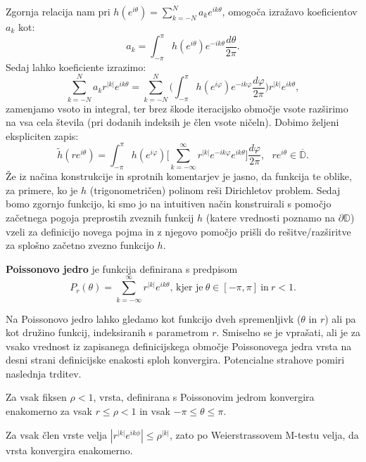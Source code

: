 \documentclass[mat1]{fmfdelo}
\begin{document}
        Zgornja relacija nam pri $h(e^{i\theta}) = \sum_{k = -N}^{N}{a_k e^{ik\theta}}$, omogoča izražavo koeficientov $a_k$ kot:
        $$
            a_ k = \int_{-\pi}^{\pi}{h(e^{i\theta}) e^{-ik\theta}\frac{d\theta}{2\pi}}.
        $$
    Sedaj lahko koeficiente izrazimo:
    $$
        \sum_{k = - N}^{N}{ a_k r^{|k|}e^{ik\theta}} = \sum_{k = - N}^{N} \bigg(\int_{-\pi}^{\pi}{h(e^{i \varphi}) e^{- i k \varphi} \frac{d \varphi}{2 \pi}}\bigg) r^{|k|} e^{i k \theta},
    $$
    zamenjamo vsoto in integral, ter brez škode iteracijsko območje vsote razširimo na vsa cela števila (pri dodanih indeksih je člen vsote ničeln). Dobimo željeni ekspliciten zapis:
    \begin{equation}
        \label{int1}
        \tag{P}
        \widetilde{h}(r e^{i \theta}) = \int_{-\pi}^{\pi}{h(e^{i \varphi}) \bigg[\sum_{k = - \infty}^{\infty} r^{|k|} e^{- i k \varphi} e^{i k \theta}} \bigg]\frac{d \varphi}{2 \pi}, ~~~ r e^{i\theta} \in \overline{\mathbb{D}}.
    \end{equation}
    Že iz načina konstrukcije in sprotnih komentarjev je jasno, da funkcija te oblike, za primere, ko je $h$ (trigonometričen) polinom reši Dirichletov problem.
    Sedaj bomo zgornjo funkcijo, ki smo jo na intuitiven način konstruirali s pomočjo začetnega pogoja preprostih zveznih funkcij $h$ (katere vrednosti poznamo na $\partial \mathbb{D}$) vzeli za definicijo novega pojma in z njegovo pomočjo prišli do rešitve/razširitve za splošno začetno zvezno funkcijo $h$.
    \begin{definicija}
        \textbf{Poissonovo jedro} je funkcija definirana s predpisom
        $$
           P_r(\theta) = \sum_{k = -\infty}^{\infty}{r^{|k|} e^{i k \theta}}\text{, kjer je}~\theta \in [-\pi, \pi]~\text{in}~ r < 1.
        $$
    \end{definicija}
    Na Poissonovo jedro lahko gledamo kot funkcijo dveh spremenljivk ($\theta$ in $r$) ali pa kot družino funkcij, indeksiranih s parametrom $r$.
    \newline
    Smiselno se je vprašati, ali je za vsako vrednost iz zapisanega definicijskega območje Poissonovega jedra vrsta na desni strani definicijske enakosti sploh konvergira. Potencialne strahove pomiri naslednja trditev.
    \begin{trditev}
        Za vsak fiksen $\rho < 1$, vrsta, definirana s Poissonovim jedrom konvergira enakomerno za vsak $r\leq \rho < 1$ in vsak $ -\pi \leq \theta \leq \pi$.
    \end{trditev}
    \begin{dokaz}
        Za vsak člen vrste velja $|r^{|k|} e^{i k \phi}| \leq \rho^{|k|}$, zato po Weierstrassovem M-testu velja, da vrsta konvergira enakomerno.
    \end{dokaz}
\end{document}
